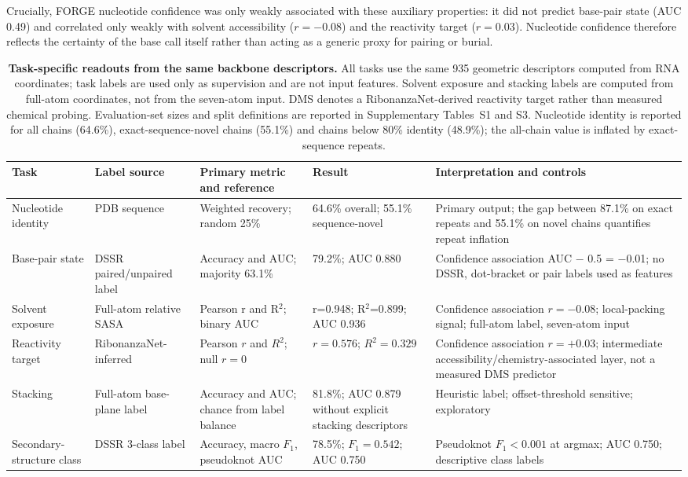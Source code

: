 Crucially, FORGE nucleotide confidence was only weakly associated with these auxiliary properties: it did not predict base-pair state (AUC 0.49) and correlated only weakly with solvent accessibility ($r=-0.08$) and the reactivity target ($r=0.03$). Nucleotide confidence therefore reflects the certainty of the base call itself rather than acting as a generic proxy for pairing or burial.

\begin{table}[htbp]
\caption{\textbf{Task-specific readouts from the same backbone descriptors.}
All tasks use the same 935 geometric descriptors computed from RNA coordinates;
task labels are used only as supervision and are not input features. Solvent exposure and
stacking labels are computed from full-atom coordinates, not from the seven-atom input. DMS
denotes a RibonanzaNet-derived reactivity target rather than measured chemical
probing. Evaluation-set sizes and split definitions are reported in
Supplementary Tables~S1 and S3. Nucleotide identity is reported for all chains (64.6\%), exact-sequence-novel chains (55.1\%) and chains below 80\% identity (48.9\%); the all-chain value is inflated by exact-sequence repeats.}
\label{tab:readouts}
\centering
\begingroup
\footnotesize
\setlength{\tabcolsep}{3pt}
\renewcommand{\arraystretch}{1.18}
\begin{tabular}{@{}L{0.13\textwidth}L{0.17\textwidth}L{0.18\textwidth}L{0.13\textwidth}L{0.31\textwidth}@{}}
\toprule
Task & Label source & Primary metric and reference & Result & Interpretation and controls \\
\midrule
Nucleotide identity & PDB sequence & Weighted recovery; random 25\% & 64.6\% overall; 55.1\% sequence-novel & Primary output; the gap between 87.1\% on exact repeats and 55.1\% on novel chains quantifies repeat inflation \\
Base-pair state & DSSR paired/unpaired label & Accuracy and AUC; majority 63.1\% & 79.2\%; AUC 0.880 & Confidence association AUC $-$ 0.5 = $-$0.01; no DSSR, dot-bracket or pair labels used as features \\
Solvent exposure & Full-atom relative SASA & Pearson r and R$^2$; binary AUC & r=0.948; R$^2$=0.899; AUC 0.936 & Confidence association $r=-0.08$; local-packing signal; full-atom label, seven-atom input \\
Reactivity target & RibonanzaNet-inferred & Pearson $r$ and $R^2$; null $r=0$ & $r=0.576$; $R^2=0.329$ & Confidence association $r=+0.03$; intermediate accessibility/chemistry-associated layer, not a measured DMS predictor \\
Stacking & Full-atom base-plane label & Accuracy and AUC; chance from label balance & 81.8\%; AUC 0.879 without explicit stacking descriptors & Heuristic label; offset-threshold sensitive; exploratory \\
Secondary-structure class & DSSR 3-class label & Accuracy, macro $F_1$, pseudoknot AUC & 78.5\%; $F_1=0.542$; AUC 0.750 & Pseudoknot $F_1<0.001$ at argmax; AUC 0.750; descriptive class labels \\
\bottomrule
\end{tabular}
\endgroup
\end{table}

